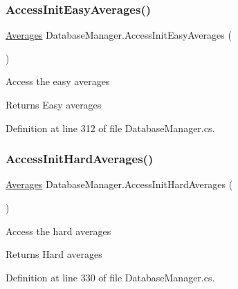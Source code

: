 \mbox{\label{class_database_manager_a8b767bfbaf23f5ebc65fb3616db8932b}} 
\subsubsection{\texorpdfstring{Access\+Init\+Easy\+Averages()}{AccessInitEasyAverages()}}
{\footnotesize\ttfamily \mbox{\hyperlink{struct_level_generation_1_1_averages}{Averages}} Database\+Manager.\+Access\+Init\+Easy\+Averages (\begin{DoxyParamCaption}{ }\end{DoxyParamCaption})}



Access the easy averages 

\begin{DoxyReturn}{Returns}
Easy averages
\end{DoxyReturn}


Definition at line 312 of file Database\+Manager.\+cs.

\mbox{\label{class_database_manager_a61d0614a2d858005a6c3abac1283c8f2}} 
\subsubsection{\texorpdfstring{Access\+Init\+Hard\+Averages()}{AccessInitHardAverages()}}
{\footnotesize\ttfamily \mbox{\hyperlink{struct_level_generation_1_1_averages}{Averages}} Database\+Manager.\+Access\+Init\+Hard\+Averages (\begin{DoxyParamCaption}{ }\end{DoxyParamCaption})}



Access the hard averages 

\begin{DoxyReturn}{Returns}
Hard averages
\end{DoxyReturn}


Definition at line 330 of file Database\+Manager.\+cs.

